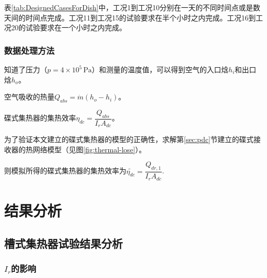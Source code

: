 表\ref{tab:DesignedCasesForDish}中，工况1到工况10分别在一天的不同时间点或是数天间的时间点完成。工况11到工况15的试验要求在半个小时之内完成。工况16到工况20的试验要求在一个小时之内完成。

\subsubsection{数据处理方法}
知道了压力（$p = 4\times10^5\,\mathrm{Pa}$）和测量的温度值，可以得到空气的入口焓$h_i$和出口焓$h_o$。

空气吸收的热量$Q_{abs} = \dot{m}(h_o - h_i)$。

碟式集热器的集热效率$\eta_{dc} = \dfrac{Q_{abs}}{I_r A_{dc}}$。

为了验证本文建立的碟式集热器的模型的正确性，求解第\ref{sec:pdc}节建立的碟式接收器的热网络模型（见图\ref{fig:thermal-lose}）。

则模拟所得的碟式集热器的集热效率为$\widetilde{\eta_{dc}} = \dfrac{Q_{dr,1}}{I_r A_{dc}}$.

\section{结果分析}
\subsection{槽式集热器试验结果分析}

\subsubsection{$I_r$的影响}


